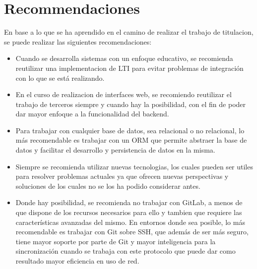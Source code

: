 
\chapter{Recommendaciones}
\label{capitulo8}

En base a lo que se ha aprendido en el camino de realizar el trabajo de titulacion, se puede realizar las siguientes recomendaciones:

\begin{itemize}
  \item Cuando se desarrolla sistemas con un enfoque educativo, se recomienda reutilizar una implementacion de LTI para evitar problemas de integración con lo que se está realizando.
  \item En el curso de realizacion de interfaces web, se recomiendo reutilizar el trabajo de terceros siempre y cuando hay la posibilidad, con el fin de poder dar mayor enfoque a la funcionalidad del backend.
  \item Para trabajar con cualquier base de datos, sea relacional o no relacional, lo más recomendable es trabajar con un ORM que permite abstraer la base de datos y facilitar el desarrollo y persistencia de datos en la misma.
  \item Siempre se recomienda utilizar nuevas tecnologias, los cuales pueden ser utiles para resolver problemas actuales ya que ofrecen nuevas perspectivas y soluciones de los cuales no se los ha podido considerar antes.
  \item Donde hay posibilidad, se recomienda no trabajar con GitLab, a menos de que dispone de los recursos necesarios para ello y tambien que requiere las características avanzadas del mismo. En entornos donde sea posible, lo más recomendable es trabajar con Git sobre SSH, que además de ser más seguro, tiene mayor soporte por parte de Git y mayor inteligencia para la sincronización cuando se trabaja con este protocolo que puede dar como resultado mayor eficiencia en uso de red.
\end{itemize}


